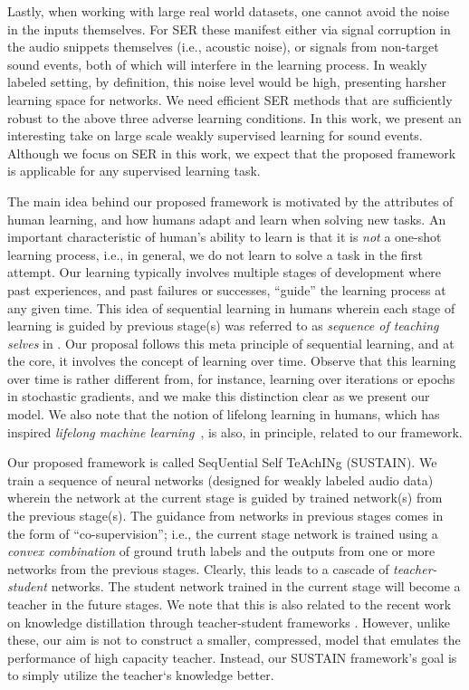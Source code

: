 \documentclass{article}
\begin{document}
Lastly, when working with large real world datasets, one cannot avoid the noise in the inputs themselves.
For SER these manifest either via signal corruption in the audio snippets themselves (i.e., acoustic noise), 
or signals from non-target sound events, both of which will interfere in the learning process. 
In weakly labeled setting, by definition, this noise level would be high, presenting harsher learning space for networks. 
We need efficient SER methods that are sufficiently robust to the above three adverse learning conditions. 
In this work, we present an interesting take on large scale weakly supervised learning for sound events.
Although we focus on SER in this work, we expect that 
the proposed framework is applicable for any supervised learning task. 


The main idea behind our proposed framework is motivated by the attributes of human learning, 
and how humans adapt and learn when solving new tasks. 
An important characteristic of human's ability to learn is that it is {\it not} a one-shot learning process, 
i.e., in general, we do not learn to solve a task in the first attempt. 
Our learning typically involves multiple stages of development where past experiences, and past failures or successes, 
``guide'' the learning process at any given time. 
This idea of sequential learning in humans wherein each stage of learning is guided by previous stage(s) was referred to as \emph{sequence of teaching selves} in \cite{minsky1994society}. 
Our proposal follows this meta principle of sequential learning, and at the core, it involves the concept of learning over time. 
Observe that this learning over time is rather different from, for instance, 
learning over iterations or epochs in stochastic gradients, and we make this distinction clear as we present our model. 
We also note that the notion of lifelong learning in humans, which has inspired \emph{lifelong machine learning}~\cite{silver2013lifelong,parisi2019continual}, is also, in principle, related to our framework. 

Our proposed framework is called SeqUential Self TeAchINg (SUSTAIN). 
We train a sequence of neural networks (designed for weakly labeled audio data) wherein 
the network at the current stage is guided by trained network(s) from the previous stage(s). 
The guidance from networks in previous stages comes in the form of ``co-supervision''; 
i.e., the current stage network is trained using a \emph{convex combination} of ground truth labels and the outputs from one or more networks from the previous stages. 
Clearly, this leads to a cascade of {\it teacher-student} networks. 
The student network trained in the current stage will become a teacher in the future stages. 
We note that this is also related to the recent work on knowledge distillation through teacher-student frameworks \cite{hinton2015distilling, ba2014deep, bucilua2006model}. 
However, unlike these, our aim is not to construct a smaller, compressed, model that emulates the performance of high capacity teacher. 
Instead, our SUSTAIN framework's goal is to simply utilize the teacher`s knowledge better. 
\end{document}
